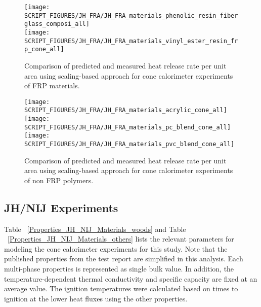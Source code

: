 \begin{figure}[h!]
\texttt{[image: SCRIPT\_FIGURES/JH\_FRA/JH\_FRA\_materials\_phenolic\_resin\_fiberglass\_composi\_all]} \\
\texttt{[image: SCRIPT\_FIGURES/JH\_FRA/JH\_FRA\_materials\_vinyl\_ester\_resin\_frp\_cone\_all]} \\
\caption[Heat release rate per unit area of JH/FRA materials using scaling model, FRP materials]
{Comparison of predicted and measured heat release rate per unit area using scaling-based approach for cone calorimeter experiments of FRP materials.}
\label{JH_FRA_HRR_frp}
\end{figure}

\begin{figure}[h!]
\texttt{[image: SCRIPT\_FIGURES/JH\_FRA/JH\_FRA\_materials\_acrylic\_cone\_all]} \\
\texttt{[image: SCRIPT\_FIGURES/JH\_FRA/JH\_FRA\_materials\_pc\_blend\_cone\_all]} \\
\texttt{[image: SCRIPT\_FIGURES/JH\_FRA/JH\_FRA\_materials\_pvc\_blend\_cone\_all]} 
\caption[Heat release rate per unit area of JH/FRA materials using scaling model, non FRP polymers]
{Comparison of predicted and measured heat release rate per unit area using scaling-based approach for cone calorimeter experiments of non FRP polymers.}
\label{JH_FRA_HRR_polymers}
\end{figure}

\clearpage

\subsection{JH/NIJ Experiments}\label{sec_JH_NIJ_Materials}

Table ~\ref{Properties_JH_NIJ_Materials_woods} and Table ~\ref{Properties_JH_NIJ_Materials_others} lists the relevant parameters for modeling the cone calorimeter experiments for this study.
Note that the published properties from the test report are simplified in this analysis. Each multi-phase properties is represented as single bulk value. 
In addition, the temperature-dependent thermal conductivity and specific capacity are fixed at an average value. 
The ignition temperatures were calculated based on times to ignition at the lower heat fluxes using the other properties.

